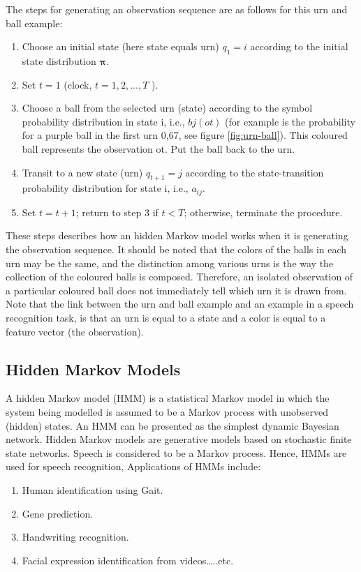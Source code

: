 \documentclass[12pt, a4paper, twoside]{report}
\begin{document}
The steps for generating an observation sequence are as follows for this urn and ball example:
\begin{enumerate}
\item Choose an initial state (here state equals urn) $q_1 = i$ according to the initial state distribution $\mathbf{\pi}$.
\item Set $t = 1$ (clock, $t = 1, 2, . . . , T$ ).
\item Choose a ball from the selected urn (state) according to the symbol probability distribution in state i, i.e., $bj(ot)$ (for example is the probability for a purple ball in the first urn 0,67, see figure \ref{fig:urn-ball}). This coloured ball represents the observation ot. Put the ball back to the urn.
\item Transit to a new state (urn) $q_{t+1} = j$ according to the state-transition probability distribution for state i, i.e., $a_{ij}$. 
\item Set $t = t+1$; return to step 3 if $t < T$; otherwise, terminate the procedure.
\end{enumerate}
These steps describes how an hidden Markov model works when it is generating the observation sequence. It should be noted that the colors of the balls in each urn may be the same, and the distinction among various urns is the way the collection of the coloured balls is composed. Therefore, an isolated observation of a particular coloured ball does not immediately tell which urn it is drawn from. Note that the link between the urn and ball example and an example in a speech recognition task, is that an urn is equal to a state and a color is equal to a feature vector (the observation).
\subsection{Hidden Markov Models}
A hidden Markov model (HMM) is a statistical Markov model in which the system being modelled is assumed to be a Markov process with unobserved (hidden) states. An HMM can be presented as the simplest dynamic Bayesian network. Hidden Markov models are generative models based on stochastic finite state networks. Speech is considered to be a Markov process. Hence, HMMs are used for speech recognition, Applications of HMMs include:
\begin{enumerate}
\item Human identification using Gait.
\item Gene prediction.
\item Handwriting recognition.
\item Facial expression identification from videos…..etc.
\end{enumerate}
\end{document}
